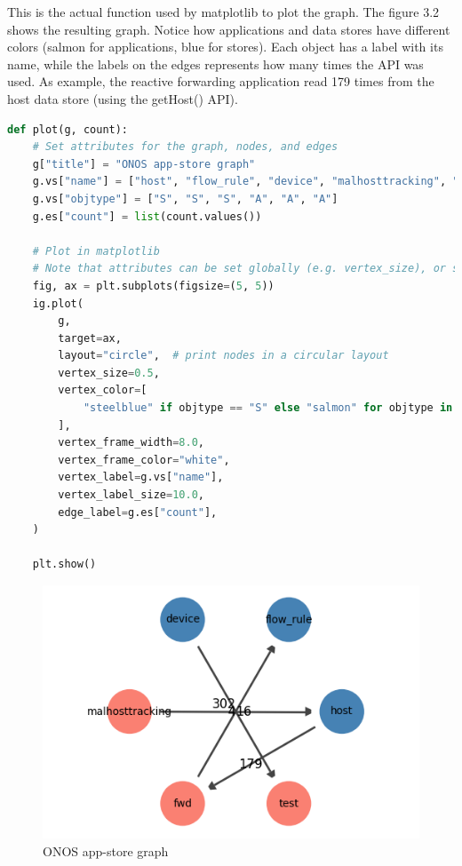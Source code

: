 This is the actual function used by matplotlib to plot the graph. The figure 3.2 shows the resulting graph. Notice how applications and data stores have different colors (salmon for applications, blue for stores). Each object has a label with its name, while the labels on the edges represents how many times the API was used. As example, the reactive forwarding application read 179 times from the host data store (using the getHost() API). 
\begin{lstlisting}[language=python,firstnumber=76]
def plot(g, count):
    # Set attributes for the graph, nodes, and edges
    g["title"] = "ONOS app-store graph"
    g.vs["name"] = ["host", "flow_rule", "device", "malhosttracking", "fwd", "test"]
    g.vs["objtype"] = ["S", "S", "S", "A", "A", "A"]
    g.es["count"] = list(count.values())

    # Plot in matplotlib
    # Note that attributes can be set globally (e.g. vertex_size), or set individually using arrays (e.g. vertex_color)
    fig, ax = plt.subplots(figsize=(5, 5))
    ig.plot(
        g,
        target=ax,
        layout="circle",  # print nodes in a circular layout
        vertex_size=0.5,
        vertex_color=[
            "steelblue" if objtype == "S" else "salmon" for objtype in g.vs["objtype"]
        ],
        vertex_frame_width=8.0,
        vertex_frame_color="white",
        vertex_label=g.vs["name"],
        vertex_label_size=10.0,
        edge_label=g.es["count"],
    )

    plt.show()
\end{lstlisting}

\begin{figure}[h]
\caption{ONOS app-store graph}
\label{fig:onos-log-graph}
\includegraphics[width=1.0\textwidth]{resources/Chapter-3/graph1.png}
\centering
\end{figure}

